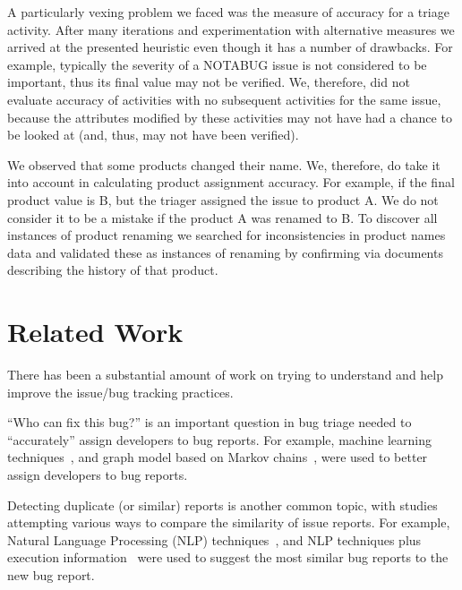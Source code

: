\documentclass[conference]{IEEEtran}
\begin{document}
A particularly vexing problem we faced was the measure of accuracy
for a triage activity. After many iterations and experimentation
with alternative measures we arrived at the presented heuristic even
though it has a number of drawbacks.  For example, typically
the severity of a NOTABUG issue is not considered to be important,
thus its final value may not be verified. We, therefore, did not
evaluate accuracy of activities with no subsequent activities for the same
issue, because the attributes modified by these activities may not
have had a chance to be looked at (and, thus, may not have been
verified).

We observed that some products changed their name. We, therefore, do
take it into account in calculating product assignment
accuracy. For example, if the final product value is B, but the
triager assigned the issue to product A.  We do not consider it to
be a mistake if the product A was renamed to B. To discover all instances of
product renaming we searched for inconsistencies in product names
data and validated these as instances of renaming by confirming via
documents describing the history of that product.
\vspace{-0.05in}

\section{Related Work}\label{s:related}
There has been a substantial amount of work on trying to understand
and help improve the issue/bug tracking practices.

``Who can fix this bug?'' is an important question
in bug triage needed to ``accurately'' assign developers to bug
reports.  For example, machine learning techniques~\cite{Anvik2006, Anvik2011},
and graph model based on Markov chains~\cite{Jeong2009},
were used to better assign developers to bug reports.

Detecting duplicate (or similar) reports is another
common topic, with studies attempting various ways to
compare the similarity of issue reports.  For example,
Natural Language Processing (NLP) techniques~\cite{Runeson07},
and NLP techniques plus execution information~\cite{Wang2008}
were used to suggest the most similar bug reports to the new bug report.
\end{document}

